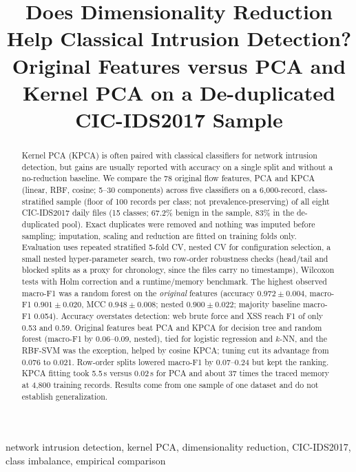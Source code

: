 \documentclass[conference]{IEEEtran}
\begin{document}
\title{Does Dimensionality Reduction Help Classical Intrusion Detection? Original Features versus PCA and Kernel PCA on a De-duplicated CIC-IDS2017 Sample}

\author{}

\maketitle

\begin{abstract}
Kernel PCA (KPCA) is often paired with classical classifiers for network intrusion detection, but gains are usually reported with accuracy on a single split and without a no-reduction baseline. We compare the 78 original flow features, PCA and KPCA (linear, RBF, cosine; 5--30 components) across five classifiers on a 6{,}000-record, class-stratified sample (floor of 100 records per class; not prevalence-preserving) of all eight CIC-IDS2017 daily files (15 classes; 67.2\% benign in the sample, 83\% in the de-duplicated pool). Exact duplicates were removed and nothing was imputed before sampling; imputation, scaling and reduction are fitted on training folds only. Evaluation uses repeated stratified 5-fold CV, nested CV for configuration selection, a small nested hyper-parameter search, two row-order robustness checks (head/tail and blocked splits as a proxy for chronology, since the files carry no timestamps), Wilcoxon tests with Holm correction and a runtime/memory benchmark. The highest observed macro-F1 was a random forest on the \emph{original} features (accuracy $0.972\pm0.004$, macro-F1 $0.901\pm0.020$, MCC $0.948\pm0.008$; nested $0.900\pm0.022$; majority baseline macro-F1 0.054). Accuracy overstates detection: web brute force and XSS reach F1 of only 0.53 and 0.59. Original features beat PCA and KPCA for decision tree and random forest (macro-F1 by 0.06--0.09, nested), tied for logistic regression and $k$-NN, and the RBF-SVM was the exception, helped by cosine KPCA; tuning cut its advantage from 0.076 to 0.021. Row-order splits lowered macro-F1 by 0.07--0.24 but kept the ranking. KPCA fitting took 5.5\,s versus 0.02\,s for PCA and about 37 times the traced memory at 4{,}800 training records. Results come from one sample of one dataset and do not establish generalization.
\end{abstract}

\begin{IEEEkeywords}
network intrusion detection, kernel PCA, dimensionality reduction, CIC-IDS2017, class imbalance, empirical comparison
\end{IEEEkeywords}
\end{document}
